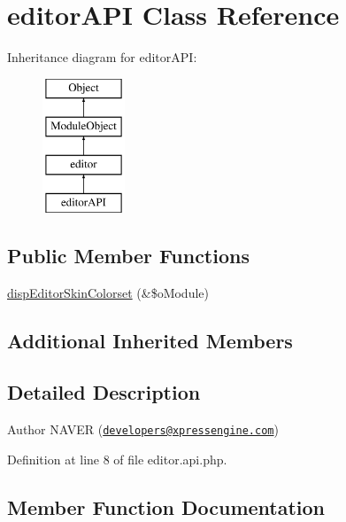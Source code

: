 \hypertarget{classeditorAPI}{}\section{editor\+A\+PI Class Reference}
\label{classeditorAPI}
Inheritance diagram for editor\+A\+PI\+:\begin{figure}[H]
\begin{center}
\leavevmode
\includegraphics[height=4.000000cm]{classeditorAPI}
\end{center}
\end{figure}
\subsection*{Public Member Functions}
\begin{DoxyCompactItemize}
\item 
\hyperlink{classeditorAPI_ac6a42a6742ae44bc20883ad3db8c30a1}{disp\+Editor\+Skin\+Colorset} (\&\$o\+Module)
\end{DoxyCompactItemize}
\subsection*{Additional Inherited Members}


\subsection{Detailed Description}
\begin{DoxyAuthor}{Author}
N\+A\+V\+ER (\href{mailto:developers@xpressengine.com}{\tt developers@xpressengine.\+com}) 
\end{DoxyAuthor}


Definition at line 8 of file editor.\+api.\+php.



\subsection{Member Function Documentation}
\mbox{\label{classeditorAPI_ac6a42a6742ae44bc20883ad3db8c30a1}} 
